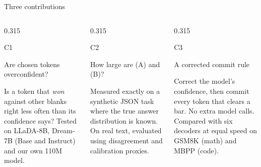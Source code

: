 \documentclass[aspectratio=169,10pt,t]{beamer}
\newcommand{\A}{{\color{dep}\firasemibold (A)}\xspace}
\newcommand{\B}{{\color{est}\firasemibold (B)}\xspace}
\newcommand{\paneltitle}[1]{{\color{accentdark}\small\firasemibold #1}\par\vspace{0.8mm}}
\begin{document}
\begin{frame}{Three contributions}
  \vspace{2mm}
  \begin{columns}[T,onlytextwidth]
    \begin{column}{0.315\textwidth}
      \begin{panel}[height=40mm]
        {\color{accent}\fontsize{16}{18}\selectfont\firasemibold C1}\par\vspace{0.8mm}
        \paneltitle{Are chosen tokens overconfident?}
        Is a token that \emph{won} against other blanks right less often than its confidence
        says? Tested on LLaDA-8B, Dream-7B (Base and Instruct) and our own 110M model.
      \end{panel}
    \end{column}
    \begin{column}{0.315\textwidth}
      \begin{panel}[height=40mm]
        {\color{accent}\fontsize{16}{18}\selectfont\firasemibold C2}\par\vspace{0.8mm}
        \paneltitle{How large are \A and \B?}
        Measured exactly on a synthetic JSON task where the true answer distribution is
        known. On real text, evaluated using disagreement and calibration proxies.
      \end{panel}
    \end{column}
    \begin{column}{0.315\textwidth}
      \begin{panel}[height=40mm]
        {\color{accent}\fontsize{16}{18}\selectfont\firasemibold C3}\par\vspace{0.8mm}
        \paneltitle{A corrected commit rule}
        Correct the model's confidence, then commit every token that clears a bar. No extra
        model calls. Compared with six decoders at equal speed on GSM8K (math) and MBPP (code).
      \end{panel}
    \end{column}
  \end{columns}
\end{frame}
\end{document}

